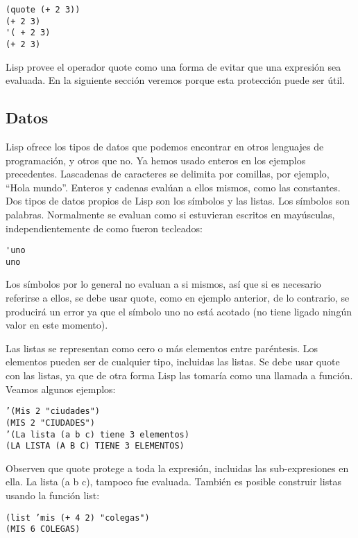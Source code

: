 \documentclass[11pt]{article}
\begin{document}
\begin{verbatim}
(quote (+ 2 3))
(+ 2 3)
'( + 2 3)
(+ 2 3)
\end{verbatim}

Lisp provee el operador quote como una forma de evitar que una
expresión sea evaluada. En la siguiente sección veremos porque esta
protección puede ser útil.

\subsection*{Datos}
\label{sec:orgd64f70c}

Lisp ofrece los tipos de datos que podemos encontrar en otros
lenguajes de programación, y otros que no. Ya hemos usado enteros en
los ejemplos precedentes. Lascadenas de caracteres se delimita por
comillas, por ejemplo, “Hola mundo”. Enteros y cadenas evalúan a ellos
mismos, como las constantes.  Dos tipos de datos propios de Lisp son
los símbolos y las listas. Los símbolos son palabras. Normalmente se
evaluan como si estuvieran escritos en mayúsculas, independientemente
de como fueron tecleados:

\begin{verbatim}
'uno
uno
\end{verbatim}

Los símbolos por lo general no evaluan a si mismos, así que si es
necesario referirse a ellos, se debe usar quote, como en ejemplo
anterior, de lo contrario, se producirá un error ya que el símbolo uno
no está acotado (no tiene ligado ningún valor en este momento).

Las listas se representan como cero o más elementos entre paréntesis. Los
elementos pueden ser de cualquier tipo, incluidas las listas. Se debe usar
quote con las listas, ya que de otra forma Lisp las tomaría como una llamada
a función. Veamos algunos ejemplos:

\begin{verbatim}
’(Mis 2 "ciudades")
(MIS 2 "CIUDADES")
’(La lista (a b c) tiene 3 elementos)
(LA LISTA (A B C) TIENE 3 ELEMENTOS)
\end{verbatim}

Observen que quote protege a toda la expresión, incluidas las
sub-expresiones en ella. La lista (a b c), tampoco fue
evaluada. También es posible construir listas usando la función list:

\begin{verbatim}
(list ’mis (+ 4 2) "colegas")
(MIS 6 COLEGAS)
\end{verbatim}
\end{document}
